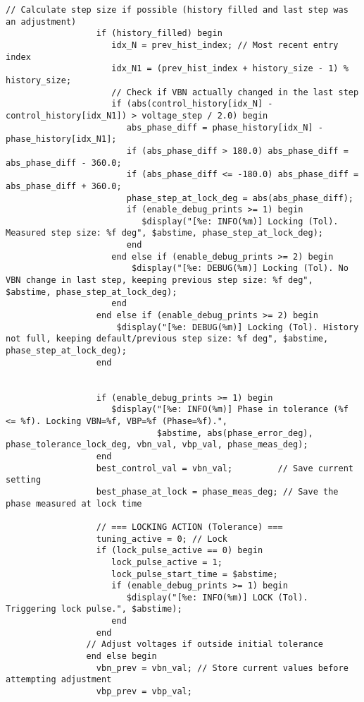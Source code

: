\begin{lstlisting}[caption={Verilog-A Generic Vb Tuner Implementation}]
                  // Calculate step size if possible (history filled and last step was an adjustment)
                  if (history_filled) begin
                     idx_N = prev_hist_index; // Most recent entry index
                     idx_N1 = (prev_hist_index + history_size - 1) % history_size;
                     // Check if VBN actually changed in the last step
                     if (abs(control_history[idx_N] - control_history[idx_N1]) > voltage_step / 2.0) begin
                        abs_phase_diff = phase_history[idx_N] - phase_history[idx_N1];
                        if (abs_phase_diff > 180.0) abs_phase_diff = abs_phase_diff - 360.0;
                        if (abs_phase_diff <= -180.0) abs_phase_diff = abs_phase_diff + 360.0;
                        phase_step_at_lock_deg = abs(abs_phase_diff);
                        if (enable_debug_prints >= 1) begin
                           $display("[%e: INFO(%m)] Locking (Tol). Measured step size: %f deg", $abstime, phase_step_at_lock_deg);
                        end
                     end else if (enable_debug_prints >= 2) begin
                         $display("[%e: DEBUG(%m)] Locking (Tol). No VBN change in last step, keeping previous step size: %f deg", $abstime, phase_step_at_lock_deg);
                     end
                  end else if (enable_debug_prints >= 2) begin
                      $display("[%e: DEBUG(%m)] Locking (Tol). History not full, keeping default/previous step size: %f deg", $abstime, phase_step_at_lock_deg);
                  end


                  if (enable_debug_prints >= 1) begin
                     $display("[%e: INFO(%m)] Phase in tolerance (%f <= %f). Locking VBN=%f, VBP=%f (Phase=%f).",
                              $abstime, abs(phase_error_deg), phase_tolerance_lock_deg, vbn_val, vbp_val, phase_meas_deg);
                  end
                  best_control_val = vbn_val;         // Save current setting
                  best_phase_at_lock = phase_meas_deg; // Save the phase measured at lock time

                  // === LOCKING ACTION (Tolerance) ===
                  tuning_active = 0; // Lock
                  if (lock_pulse_active == 0) begin
                     lock_pulse_active = 1;
                     lock_pulse_start_time = $abstime;
                     if (enable_debug_prints >= 1) begin
                        $display("[%e: INFO(%m)] LOCK (Tol). Triggering lock pulse.", $abstime);
                     end
                  end
                // Adjust voltages if outside initial tolerance
                end else begin
                  vbn_prev = vbn_val; // Store current values before attempting adjustment
                  vbp_prev = vbp_val;


\end{lstlisting}
